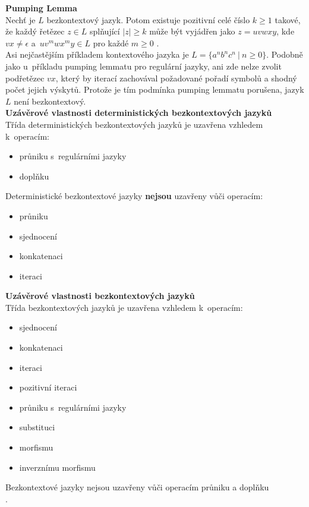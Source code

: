 \textbf{Pumping Lemma} \\
Nechť je $L$ bezkontextový jazyk. Potom existuje pozitivní celé číslo $k \geq 1$ takové, že každý \mbox{řetězec} 
$z \in L$ splňující $|z| \geq k$ může být vyjádřen jako $z = uvwxy$, kde $vx \neq \epsilon$ a~$uv^mwx^my \in L$ pro každé $m \geq 0$ \cite[str. 187]{Meduna2014}. \\

\Bat{} Asi nejčastějším příkladem kontextového jazyka je $L = \{a^nb^nc^n \ | \ n \geq 0\}$. Podobně jako u~příkladu pumping lemmatu pro regulární jazyky,
ani zde nelze zvolit podřetězec $vx$, který by iterací zachovával požadované pořadí symbolů a shodný počet jejich výskytů. Protože je tím podmínka pumping lemmatu
porušena, jazyk $L$ není bezkontextový. \\

\textbf{Uzávěrové vlastnosti deterministických bezkontextových jazyků} \\
Třída deterministických bezkontextových jazyků je uzavřena vzhledem k~operacím:
\begin{itemize}
\item průniku s~regulárními jazyky
\item doplňku \cite[str. 99]{TIN2013}
\end{itemize}
Deterministické bezkontextové jazyky \textbf{nejsou} uzavřeny vůči operacím:
\begin{itemize}
\item průniku
\item sjednocení
\item konkatenaci
\item iteraci \cite[str. 99]{TIN2013}
\end{itemize}
\vspace*{\baselineskip}

\textbf{Uzávěrové vlastnosti bezkontextových jazyků} \\
Třída bezkontextových jazyků je uzavřena vzhledem k~operacím:
\begin{itemize}
\item sjednocení
\item konkatenaci
\item iteraci
\item pozitivní iteraci
\item průniku s~regulárními jazyky
\item substituci
\item morfismu 
\item inverznímu morfismu \cite[str. 96-97]{TIN2013}
\end{itemize}
\vspace*{\baselineskip}
Bezkontextové jazyky nejsou uzavřeny vůči operacím průniku a doplňku \cite[str. 97]{TIN2013} \\.

